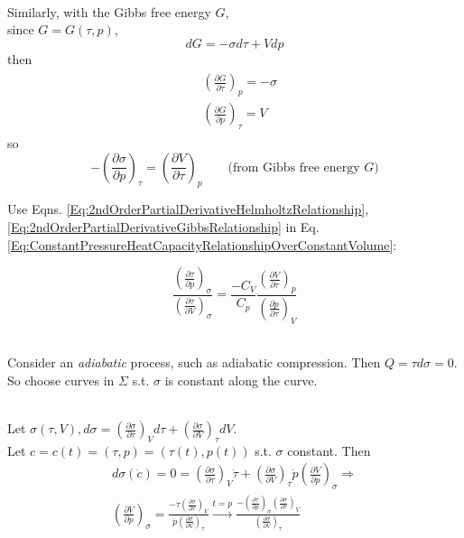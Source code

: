 \documentclass[twoside,landscape,10pt]{amsart}
\theoremstyle{plain}
\theoremstyle{definition}
\theoremstyle{remark}
\theoremstyle{remark}
\begin{document}
\begin{multicols*}{2}
\quad \\ 
Similarly, with the Gibbs free energy $G$, \\
since $G=G(\tau, p)$, 
\[
dG = -\sigma d\tau + Vdp
\]
then 
\[
\begin{gathered}
\begin{aligned}
& \left( \frac{\partial G}{\partial \tau} \right)_p = -\sigma \\ 
& \left( \frac{ \partial G}{\partial p} \right)_{\tau} = V
\end{aligned} 
\end{gathered}
\]
so 
\begin{equation}\label{Eq:2ndOrderPartialDerivativeGibbsRelationship}
-\left( \frac{ \partial \sigma}{ \partial p} \right)_{\tau} = \left(\frac{\partial V}{\partial \tau } \right)_p \qquad \text{(from Gibbs free energy $G$)}
\end{equation}

Use Eqns. \ref{Eq:2ndOrderPartialDerivativeHelmholtzRelationship}, \ref{Eq:2ndOrderPartialDerivativeGibbsRelationship} in Eq. \ref{Eq:ConstantPressureHeatCapacityRelationshipOverConstantVolume}:

\begin{equation}\label{Eq:ConstantPressureHeatCapacityRelationshipOverConstantVolume2}
\frac{ \left( \frac{\partial \tau}{\partial p}\right)_{\sigma} }{ \left( \frac{\partial \tau}{\partial V}\right)_{\sigma} } = \frac{-C_V}{C_p} \frac{ \left( \frac{\partial V}{\partial \tau}\right)_p }{ \left( \frac{\partial p}{\partial \tau}\right)_V } 
\end{equation}

\quad \\ 
Consider an \emph{adiabatic} process, such as adiabatic compression. Then $Q = \tau d\sigma = 0$. So choose curves in $\Sigma$ s.t. $\sigma$ is constant along the curve.

\quad \\
Let $\sigma(\tau, V), d\sigma = \left( \frac{\partial \sigma}{\partial \tau} \right)_V d\tau + \left( \frac{\partial \sigma}{\partial V} \right)_{\tau} dV$. \\
Let $c=c(t)= (\tau, p) = (\tau(t), p(t))$ s.t. $\sigma$ constant. Then
\begin{equation}\label{Eq:AdiabaticDifferentialRelationship1}
\begin{gathered}
d\sigma(\dot{c}) = 0 = \left( \frac{\partial \sigma}{\partial \tau} \right)_V \dot{\tau} + \left( \frac{\partial \sigma}{\partial V} \right)_{\tau} \dot{p} \left( \frac{\partial V}{ \partial p } \right)_{\sigma} \Longrightarrow \\
\left( \frac{\partial V}{\partial p} \right)_{\sigma} = \frac{ - \dot{\tau} \left( \frac{\partial \sigma}{\partial \tau} \right)_V }{ \dot{p} \left( \frac{\partial \sigma}{\partial V} \right)_{\tau} }\xrightarrow{t = p} \frac{ - \left( \frac{\partial \tau}{\partial p} \right)_{\sigma} \left( \frac{\partial \sigma}{\partial \tau}\right)_V }{ \left( \frac{\partial \sigma}{\partial V}\right)_{\tau} } 
\end{gathered}
\end{equation}


\end{multicols*}
\end{document}
